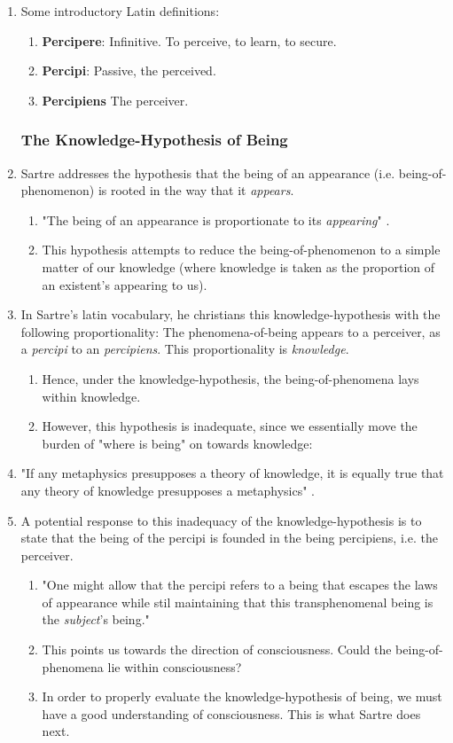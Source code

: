 \begin{enumerate}
  \item Some introductory Latin definitions:
  \begin{enumerate}
    \item \textbf{Percipere}: Infinitive. To perceive, to learn, to secure.
    \item \textbf{Percipi}: Passive, the perceived.
    \item \textbf{Percipiens} The perceiver.
  \end{enumerate}

  \subsubsection{The Knowledge-Hypothesis of Being}
  \item Sartre addresses the hypothesis that the being of an appearance (i.e. being-of-phenomenon) is rooted in the way that it \emph{appears}.
  \begin{enumerate}
    \item "The being of an appearance is proportionate to its \emph{appearing}" \autocite[8]{sartre}.
    \item This hypothesis attempts to reduce the being-of-phenomenon to a simple matter of our knowledge (where knowledge is taken as the proportion of an existent's appearing to us).
  \end{enumerate}
  \item In Sartre's latin vocabulary, he christians this knowledge-hypothesis with the following proportionality: The phenomena-of-being appears to a perceiver, as a \emph{percipi} to an \emph{percipiens}. This proportionality is \emph{knowledge}.
  \begin{enumerate}
    \item Hence, under the knowledge-hypothesis, the being-of-phenomena lays within knowledge.
    \item However, this hypothesis is inadequate, since we essentially move the burden of "where is being" on towards knowledge:
  \end{enumerate}
  \item "If any metaphysics presupposes a theory of knowledge, it is equally true that any theory of knowledge presupposes a metaphysics" \autocite[8]{sartre}.
  \item A potential response to this inadequacy of the knowledge-hypothesis is to state that the being of the percipi is founded in the being percipiens, i.e. the perceiver.
  \begin{enumerate}
    \item "One might allow that the percipi refers to a being that escapes the laws of appearance while stil maintaining that this transphenomenal being is the \emph{subject}'s being." \autocite[9]{sartre}
    \item This points us towards the direction of consciousness. Could the being-of-phenomena lie within consciousness?
    \item In order to properly evaluate the knowledge-hypothesis of being, we must have a good understanding of consciousness. This is what Sartre does next.


\end{enumerate}
\end{enumerate}
